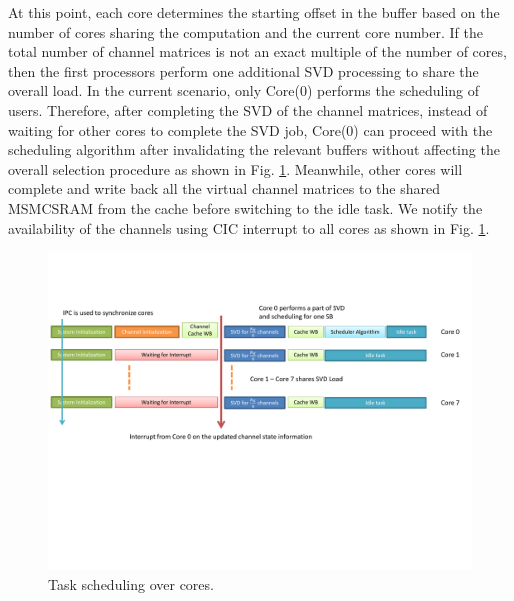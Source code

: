\documentclass[conference,letterpaper]{./../../IEEE/IEEEtran}
\begin{document}
At this point, each core determines the starting offset in the buffer based on the number of cores sharing the computation and the current core number. If the total number of channel matrices is not an exact multiple of the number of cores, then the first  processors perform one additional SVD processing to share the overall load. In the current scenario, only Core(0) performs the scheduling of users. Therefore, after completing the SVD of the channel matrices, instead of waiting for other cores to complete the SVD job, Core(0) can proceed with the scheduling algorithm after invalidating the relevant buffers without affecting the overall selection procedure as shown in Fig. \ref{sched_cores}. Meanwhile, other cores will complete and write back all the virtual channel matrices to the shared \ac{MSMCSRAM} from the cache before switching to the idle task. We notify the availability of the channels using \ac{CIC} interrupt to all cores as shown in Fig. \ref{sched_cores}.
\begin{figure}
	\centering
	\includegraphics[trim=0in 3.25in 0in 1.5in,width=\columnwidth]{overall_scheduling}
	\caption{Task scheduling over  cores.}
	\label{sched_cores}
	\vspace{-0.15in}
\end{figure}
\end{document}

